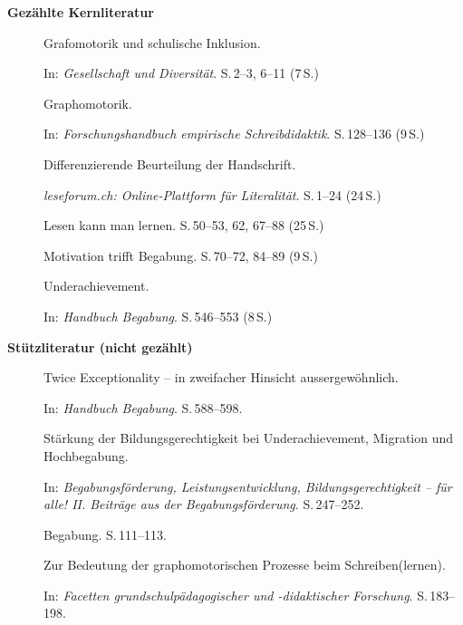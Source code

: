\textbf{Gezählte Kernliteratur}

\begin{description}
  \item[\cite{saegesserwyss2022grafinkrahmenmodell}] Grafomotorik und schulische Inklusion.
    
    In: \textit{Gesellschaft und Diversit\"at}.
    S.\,2--3, 6--11 (7\,S.)

  \item[\cite{nottbusch2017graphomotorik}] Graphomotorik.
    
    In: \textit{Forschungshandbuch empirische Schreibdidaktik}.
    S.\,128--136 (9\,S.)

  \item[\cite{hurschler2020handschriftbeurteilung}] Differenzierende Beurteilung der Handschrift.
    
    \textit{leseforum.ch: Online-Plattform für Literalität}.
    S.\,1--24 (24\,S.)

  \item[\cite{gold2018lesenkannmanlernen}] Lesen kann man lernen.
    S.\,50--53, 62, 67--88 (25\,S.)

  \item[\cite{lehwald2017motivation}] Motivation trifft Begabung.
    S.\,70--72, 84--89 (9\,S.)

  \item[\cite{greiten2021underachievement}] Underachievement.
    
    In: \textit{Handbuch Begabung}.
    S.\,546--553 (8\,S.)

\end{description}

\textbf{Stützliteratur (nicht gezählt)}

\begin{description}
  \item[\cite{baumschader2021twice}] {Twice Exceptionality} -- in zweifacher Hinsicht aussergewöhnlich.
    
    In: \textit{Handbuch Begabung}.
    S.\,588--598.

  \item[\cite{warneckehauke2020bildungsgerechtigkeit}] Stärkung der Bildungsgerechtigkeit bei Underachievement, Migration und Hochbegabung.
    
    In: \textit{Begabungsförderung, Leistungsentwicklung, Bildungsgerechtigkeit -- für alle! II. Beiträge aus der Begabungsförderung}.
    S.\,247--252.

  \item[\cite{hoyer2013begabung}] Begabung.
    S.\,111--113.

  \item[\cite{sturm2016graphomotorik}] Zur Bedeutung der graphomotorischen Prozesse beim Schreiben(lernen).
    
    In: \textit{Facetten grundschulpädagogischer und -didaktischer Forschung}.
    S.\,183--198.

\end{description}

